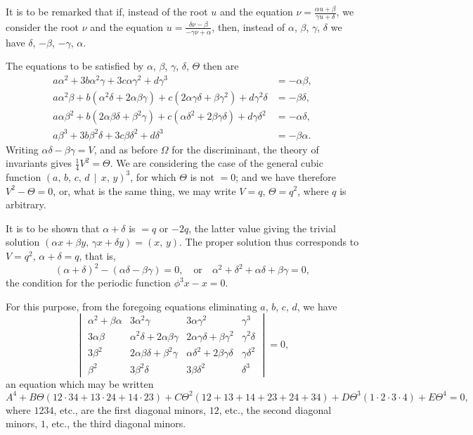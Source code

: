 \documentclass[11pt,a4paper]{book}
\begin{document}
It is to be remarked that if, instead of the root $u$ and the equation $\nu = \frac{\alpha u + \beta}{\gamma u + \delta}$, we consider the root $\nu$ and the equation $u = \frac{\delta\nu - \beta}{-\gamma\nu + \alpha}$, then, instead of $\alpha$, $\beta$, $\gamma$, $\delta$ we have $\delta$, $-\beta$, $-\gamma$, $\alpha$.

The equations to be satisfied by $\alpha$, $\beta$, $\gamma$, $\delta$, $\Theta$ then are
\begin{align*}
a\alpha^{2} + 3b\alpha^{2}\gamma + 3c\alpha\gamma^{2} + d\gamma^{3} &= -\alpha\beta,\\
a\alpha^{2}\beta + b(\alpha^{2}\delta + 2\alpha\beta\gamma) + c(2\alpha\gamma\delta + \beta\gamma^{2}) + d\gamma^{2}\delta &= -\beta\delta,\\
a\alpha\beta^{2} + b(2\alpha\beta\delta + \beta^{2}\gamma) + c(\alpha\delta^{2} + 2\beta\gamma\delta) + d\gamma\delta^{2} &= -\alpha\delta,\\
a\beta^{3} + 3b\beta^{2}\delta + 3c\beta\delta^{2} + d\delta^{3} &= -\beta\alpha.
\end{align*}
Writing $\alpha\delta - \beta\gamma = V$, and as before $\Omega$ for the discriminant, the theory of invariants gives $\frac{1}{4}V^{2} = \Theta$. We are considering the case of the general cubic function $(a,\, b,\, c,\, d \,\!\!\mid\!\!\, x,\, y)^{3}$, for which $\Theta$ is not $=0$; and we have therefore $V^{2} - \Theta = 0$, or, what is the same thing, we may write $V = q$, $\Theta = q^{2}$, where $q$ is arbitrary.

It is to be shown that $\alpha + \delta$ is $=q$ or $-2q$, the latter value giving the trivial solution $(\alpha x + \beta y,\, \gamma x + \delta y) = (x,\, y)$. The proper solution thus corresponds to $V = q^{2}$, $\alpha + \delta = q$, that is,
\[
(\alpha + \delta)^{2} - (\alpha\delta - \beta\gamma) = 0,\quad \text{or}\quad \alpha^{2} + \delta^{2} + \alpha\delta + \beta\gamma = 0,
\]
the condition for the periodic function $\phi^{3}x - x = 0$.

For this purpose, from the foregoing equations eliminating $a$, $b$, $c$, $d$, we have
\[
\begin{vmatrix}
\alpha^{2} + \beta\alpha & 3\alpha^{2}\gamma & 3\alpha\gamma^{2} & \gamma^{3} \\
3\alpha\beta & \alpha^{2}\delta + 2\alpha\beta\gamma & 2\alpha\gamma\delta + \beta\gamma^{2} & \gamma^{2}\delta \\
3\beta^{2} & 2\alpha\beta\delta + \beta^{2}\gamma & \alpha\delta^{2} + 2\beta\gamma\delta & \gamma\delta^{2} \\
\beta^{2} & 3\beta^{2}\delta & 3\beta\delta^{2} & \delta^{3}
\end{vmatrix} = 0,
\]
an equation which may be written
\[
A^{4} + B\Theta(12\cdot 34 + 13\cdot 24 + 14\cdot 23) + C\Theta^{2}(12 + 13 + 14 + 23 + 24 + 34) + D\Theta^{3}(1\cdot 2\cdot 3\cdot 4) + E\Theta^{4} = 0,
\]
where $1234$, etc., are the first diagonal minors, $12$, etc., the second diagonal minors, $1$, etc., the third diagonal minors.
\end{document}
